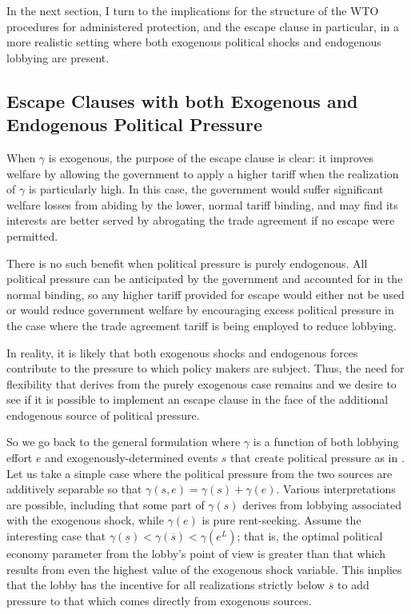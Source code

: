 \documentclass[12pt]{article}
\newcommand{\ov}{\overline}
\newcommand{\un}{\underline}
\newcommand{\ga}{\gamma}
\begin{document}
In the next section, I turn to the implications for the structure of the WTO procedures for administered protection, and the escape clause in particular, in a more realistic setting where both exogenous political shocks and endogenous lobbying are present.


\subsection{Escape Clauses with both Exogenous and Endogenous Political Pressure}
\label{sec:escape2}
When $\ga$ is exogenous, the purpose of the escape clause is clear: it improves welfare by allowing the government to apply a higher tariff when the realization of $\ga$ is particularly high. In this case, the government would suffer significant welfare losses from abiding by the lower, normal tariff binding, and may find its interests are better served by abrogating the trade agreement if no escape were permitted.

There is no such benefit when political pressure is purely endogenous. All political pressure can be anticipated by the government and accounted for in the normal binding, so any higher tariff provided for escape would either not be used or would reduce government welfare by encouraging excess political pressure in the case where the trade agreement tariff is being employed to reduce lobbying.

In reality, it is likely that both exogenous shocks and endogenous forces contribute to the pressure to which policy makers are subject. Thus, the need for flexibility that derives from the purely exogenous case remains and we desire to see if it is possible to implement an escape clause in the face of the additional endogenous source of political pressure.

So we go back to the general formulation where $\ga$ is a function of both lobbying effort $e$ and exogenously-determined events $s$ that create political pressure as in \Textcite{ms2011}. Let us take a simple case where the political pressure from the two sources are additively separable so that $\ga(s,e) = \ga(s) + \ga(e)$. Various interpretations are possible, including that some part of $\ga(s)$ derives from lobbying associated with the exogenous shock, while $\ga(e)$ is pure rent-seeking. Assume the interesting case that $\ga(\un{s}) < \ga(\ov{s}) < \ga(e^L)$; that is, the optimal political economy parameter from the lobby's point of view is greater than that which results from even the highest value of the exogenous shock variable. This implies that the lobby has the incentive for all realizations strictly below $\ov{s}$ to add pressure to that which comes directly from exogenous sources.
\end{document}
